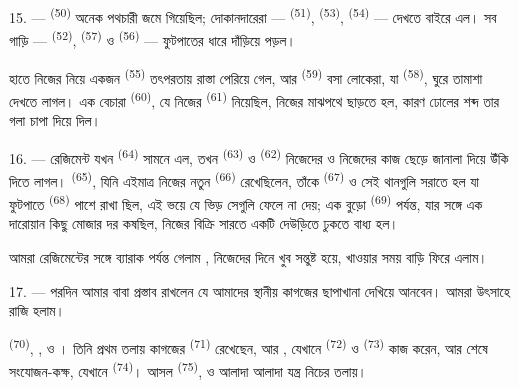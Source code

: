15. ---  \textsuperscript{(50)} অনেক পথচারী জমে গিয়েছিল;
দোকানদারেরা ---  \textsuperscript{(51)}, 
\textsuperscript{(53)},  \textsuperscript{(54)} ---
 দেখতে বাইরে এল। সব গাড়ি --- 
\textsuperscript{(52)},  \textsuperscript{(57)} ও
 \textsuperscript{(56)} --- ফুটপাতের ধারে দাঁড়িয়ে পড়ল।

\VUsaut{3.0mm}

হাতে নিজের  নিয়ে একজন 
\textsuperscript{(55)} তৎপরতায় রাস্তা পেরিয়ে গেল, আর 
\textsuperscript{(59)} বসা লোকেরা, যা  \textsuperscript{(58)},
ঘুরে তামাশা দেখতে লাগল। এক বেচারা  \textsuperscript{(60)},
যে নিজের  \textsuperscript{(61)} নিয়েছিল, নিজের
 মাঝপথে ছাড়তে হল, কারণ ঢোলের শব্দ তার গলা চাপা দিয়ে দিল।

16. --- রেজিমেন্ট যখন  \textsuperscript{(64)} সামনে এল,
তখন  \textsuperscript{(63)} ও 
\textsuperscript{(62)} নিজেদের  ও নিজেদের কাজ ছেড়ে জানালা
দিয়ে উঁকি দিতে লাগল।  \textsuperscript{(65)}, যিনি এইমাত্র
নিজের  নতুন  \textsuperscript{(66)}
রেখেছিলেন, তাঁকে  \textsuperscript{(67)} ও  সেই
থানগুলি সরাতে হল যা ফুটপাতে  \textsuperscript{(68)} পাশে রাখা
ছিল, এই ভয়ে যে ভিড় সেগুলি ফেলে না দেয়; এক বুড়ো 
\textsuperscript{(69)} পর্যন্ত, যার সঙ্গে এক দারোয়ান কিছু মোজার দর কষছিল, নিজের
বিক্রি সারতে একটি দেউড়িতে ঢুকতে বাধ্য হল।

আমরা রেজিমেন্টের সঙ্গে ব্যারাক পর্যন্ত গেলাম , নিজেদের দিনে খুব
সন্তুষ্ট হয়ে, খাওয়ার সময় বাড়ি ফিরে এলাম।

\VUsaut{3.0mm}

17. --- পরদিন আমার বাবা প্রস্তাব রাখলেন যে আমাদের স্থানীয় কাগজের ছাপাখানা
দেখিয়ে আনবেন। আমরা উৎসাহে রাজি হলাম।

  \textsuperscript{(70)},
,  ও ।
তিনি প্রথম তলায় কাগজের  \textsuperscript{(71)}
রেখেছেন, আর , যেখানে 
\textsuperscript{(72)} ও  \textsuperscript{(73)} কাজ
করেন, আর শেষে সংযোজন-কক্ষ, যেখানে 
\textsuperscript{(74)}। আসল  \textsuperscript{(75)},
 ও আলাদা আলাদা যন্ত্র নিচের তলায়।

